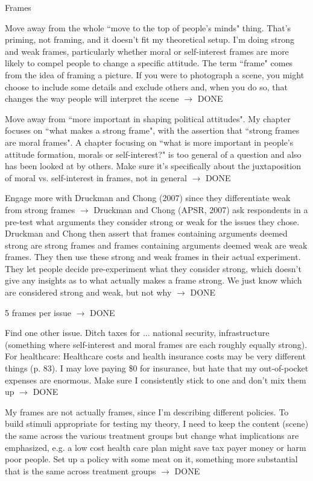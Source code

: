 \begin{coi}
\begin{coi}
			\end{coi}
		\item Frames
			\begin{coi}
				\item Move away from the whole ``move to the top of people's minds" thing. That's priming, not framing, and it doesn't fit my theoretical setup. I'm doing strong and weak frames, particularly whether moral or self-interest frames are more likely to compel people to change a specific attitude. The term ``frame" comes from the idea of framing a picture. If you were to photograph a scene, you might choose to include some details and exclude others and, when you do so, that changes the way people will interpret the scene $\rightarrow$ DONE
				\item Move away from ``more important in shaping political attitudes". My chapter focuses on ``what makes a strong frame", with the assertion that ``strong frames are moral frames". A chapter focusing on ``what is more important in people's attitude formation, morals or self-interest?" is too general of a question and also has been looked at by others. Make sure it's specifically about the juxtaposition of moral vs. self-interest in frames, not in general $\rightarrow$ DONE
				\item Engage more with Druckman and Chong (2007) since they differentiate weak from strong frames $\rightarrow$ Druckman and Chong (APSR, 2007) ask respondents in a pre-test what arguments they consider strong or weak for the issues they chose. Druckman and Chong then assert that frames containing arguments deemed strong are strong frames and frames containing arguments deemed weak are weak frames. They then use these strong and weak frames in their actual experiment. They let people decide pre-experiment what they consider strong, which doesn't give any insights as to what actually makes a frame strong. We just know which are considered strong and weak, but not why $\rightarrow$ DONE
				\item 5 frames per issue $\rightarrow$ DONE
				\item Find one other issue. Ditch taxes for ... national security, infrastructure (something where self-interest and moral frames are each roughly equally strong). For healthcare: Healthcare costs and health insurance costs  may be very different things (p. 83). I may love paying \$0 for insurance, but hate that my out-of-pocket expenses are enormous. Make sure I consistently stick to one and don't mix them up $\rightarrow$ DONE
				\item My frames are not actually frames, since I'm describing different policies. To build stimuli appropriate for testing my theory, I need to keep the content (scene) the same across the various treatment groups but change what implications are emphasized, e.g. a low cost health care plan might save tax payer money or harm poor people. Set up a policy with some meat on it, something more substantial that is the same across treatment groups $\rightarrow$ DONE

\end{coi}
\end{coi}
